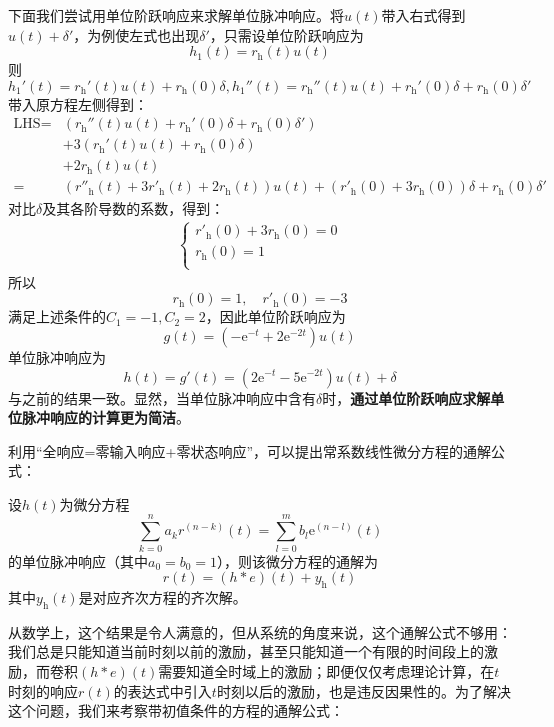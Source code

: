 \begin{example}
    下面我们尝试用单位阶跃响应来求解单位脉冲响应。将$u(t)$带入右式得到$u(t)+\delta'$，为例使左式也出现$\delta'$，只需设单位阶跃响应为
    $$h_1(t)=r_{\text{h}}(t)u(t)$$
    则
    $$h_1'(t)=r_{\text{h}}'(t)u(t)+r_{\text{h}}(0)\delta,h_1''(t)=r_{\text{h}}''(t)u(t)+r_{\text{h}}'(0)\delta+r_{\text{h}}(0)\delta'$$
    带入原方程左侧得到：\begin{align*}
        \text{LHS}=&\left(r_{\text{h}}''(t)u(t)+r_{\text{h}}'(0)\delta+r_{\text{h}}(0)\delta'\right)\\
        &+3\left(r_{\text{h}}'(t)u(t)+r_{\text{h}}(0)\delta\right)\\
        &+2r_{\text{h}}(t)u(t)\\
        =&\left(r''_{\text{h}}(t)+3r'_{\text{h}}(t)+2r_{\text{h}}(t)\right)u(t)+\left(r'_{\text{h}}(0)+3r_{\text{h}}(0)\right)\delta+r_{\text{h}}(0)\delta'
    \end{align*}
    对比$\delta$及其各阶导数的系数，得到：\begin{align*}
        \begin{cases}
            r'_{\text{h}}(0)+3r_{\text{h}}(0)=0\\
            r_{\text{h}}(0)=1\\
        \end{cases}
    \end{align*}
    所以$$r_{\text{h}}(0)=1,\quad r'_{\text{h}}(0)=-3$$
    满足上述条件的$C_1=-1,C_2=2$，因此单位阶跃响应为
    $$g(t)=(-\mathrm{e}^{-t}+2\mathrm{e}^{-2t})u(t)$$
    单位脉冲响应为
    $$h(t)=g'(t)=\left(2\mathrm{e}^{-t}-5\mathrm{e}^{-2t}\right)u(t)+\delta$$
    与之前的结果一致。显然，当单位脉冲响应中含有$\delta$时，\textbf{通过单位阶跃响应求解单位脉冲响应的计算更为简洁}。
\end{example}

利用“全响应=零输入响应+零状态响应”，可以提出常系数线性微分方程的通解公式：
\begin{theorem}
    设$h(t)$为微分方程
    \[\sum_{k=0}^{n}a_{k} r^{(n-k)}(t)=\sum_{l=0}^{m}b_{l} \mathrm{e}^{(n-l)}(t)\]
    的单位脉冲响应（其中$a_0=b_0=1$），则该微分方程的通解为
    \[r(t)=(h*e)(t)+y_{\text{h}}(t)\]
    其中$y_{\text{h}}(t)$是对应齐次方程的齐次解。
\end{theorem}

从数学上，这个结果是令人满意的，但从系统的角度来说，这个通解公式不够用：我们总是只能知道当前时刻以前的激励，甚至只能知道一个有限的时间段上的激励，而卷积$(h*e)(t)$需要知道全时域上的激励；即便仅仅考虑理论计算，在$t$时刻的响应$r(t)$的表达式中引入$t$时刻以后的激励，也是违反因果性的。为了解决这个问题，我们来考察带初值条件的方程的通解公式：

